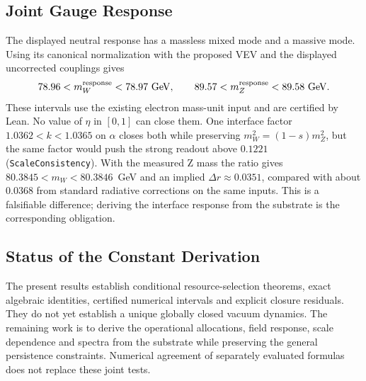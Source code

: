 \subsection{Joint Gauge Response}
The displayed neutral response has a massless mixed mode and a massive mode. Using its canonical normalization with the proposed VEV and the displayed uncorrected couplings gives
\begin{equation}
 78.96<m_W^{\rm response}<78.97\ {\rm GeV},\qquad
 89.57<m_Z^{\rm response}<89.58\ {\rm GeV}.
\end{equation}
These intervals use the existing electron mass-unit input and are certified by Lean. No value of $\eta$ in $[0,1]$ can close them. One interface factor $1.0362<k<1.0365$ on $\alpha$ closes both while preserving $m_W^2=(1-s)m_Z^2$, but the same factor would push the strong readout above $0.1221$ (\texttt{ScaleConsistency}). With the measured Z mass the ratio gives $80.3845<m_W<80.3846$~GeV and an implied $\Delta r\approx0.0351$, compared with about $0.0368$ from standard radiative corrections on the same inputs. This is a falsifiable difference; deriving the interface response from the substrate is the corresponding obligation.

\subsection{Status of the Constant Derivation}
The present results establish conditional resource-selection theorems, exact algebraic identities, certified numerical intervals and explicit closure residuals. They do not yet establish a unique globally closed vacuum dynamics. The remaining work is to derive the operational allocations, field response, scale dependence and spectra from the substrate while preserving the general persistence constraints. Numerical agreement of separately evaluated formulas does not replace these joint tests.
